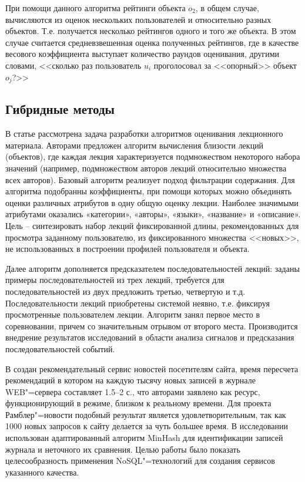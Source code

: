 \documentclass[a4paper,14pt,openany,final]{extreport} %
\begin{document}
При помощи данного алгоритма рейтинги объекта $o_2$, в общем случае, вычисляются из оценок нескольких пользователей и относительно разных объектов.  Т.е. получается несколько рейтингов одного и того же объекта. В этом случае считается средневзвешенная оценка полученных рейтингов, где в качестве весового коэффициента выступает количество раундов оценивания, другими словами, <<сколько раз пользователь $u_i$ проголосовал за <<опорный>> объект $o_j$?>>


\subsection{Гибридные методы}
\label{sec:hybrids}

В статье \cite{b11} рассмотрена задача разработки алгоритмов оценивания лекционного материала. Авторами предложен алгоритм вычисления близости лекций (объектов), где каждая лекция характеризуется подмножеством некоторого набора значений (например, подмножеством авторов лекций относительно множества всех авторов). Базовый алгоритм реализует подход фильтрации содержания. Для алгоритма подобранны коэффициенты, при помощи которых можно объединять оценки различных атрибутов в одну общую оценку лекции. Наиболее значимыми атрибутами оказались «категории», «авторы», «языки», «название» и «описание». Цель -- синтезировать набор лекций фиксированной длины, рекомендованных для просмотра заданному пользователю, из фиксированного множества <<новых>>, не использованных в построении профилей пользователя и объекта.

Далее алгоритм дополняется предсказателем последовательностей лекций: заданы примеры последовательностей из трех лекций, требуется для последовательностей из двух предложить третью, четвертую и т.д. Последовательности лекций приобретены системой неявно, т.е. фиксируя просмотренные пользователем лекции. Алгоритм занял первое место в соревновании, причем со значительным отрывом от второго места. Производится внедрение результатов исследований в области анализа сигналов и предсказания последовательностей событий.



    В \cite{b12} создан рекомендательный сервис новостей посетителям сайта, время пересчета рекомендаций в котором на каждую тысячу новых записей в журнале WEB"=сервера составляет 1.5--2 с., что авторами заявлено как ресурс, функционирующий в режиме, близком к реальному времени. Для проекта Рамблер"=новости подобный результат является удовлетворительным, так как 1000 новых запросов к сайту делается за чуть большее время. В исследовании использован адаптированный алгоритм MinHash для идентификации записей журнала и неточного их сравнения. Целью работы было показать целесообразность применения NoSQL"=технологий для создания сервисов указанного качества.
\end{document}
